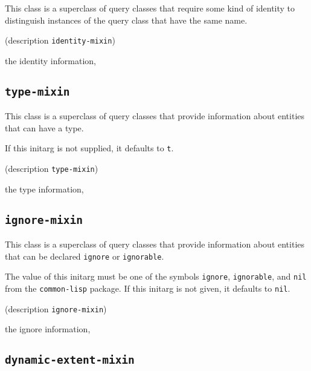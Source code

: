 This class is a superclass of query classes that require some kind of
identity to distinguish instances of the query class that have the
same name.

{\footnotesize
{}
}

{\footnotesize
{} {(description {\tt identity-mixin})}
}

 the identity information, 

\subsection{\texttt{type-mixin}}
\label{sec-type-mixin}

{\footnotesize
{}
}

This class is a superclass of query classes that provide information
about entities that can have a type.

{\footnotesize
{}
}

If this initarg is not supplied, it defaults to \texttt{t}.

{\footnotesize
{} {(description {\tt type-mixin})}
}

 the type information, 

\subsection{\texttt{ignore-mixin}}
\label{sec-ignore-mixin}

{\footnotesize
{}
}

This class is a superclass of query classes that provide information
about entities that can be declared \texttt{ignore} or \texttt{ignorable}.

{\footnotesize
{}
}

The value of this initarg must be one of the symbols \texttt{ignore},
\texttt{ignorable}, and \texttt{nil} from the \texttt{common-lisp}
package.  If this initarg is not given, it defaults to \texttt{nil}.

{\footnotesize
{} {(description {\tt ignore-mixin})}
}

 the ignore information, 

\subsection{\texttt{dynamic-extent-mixin}}
\label{sec-dynamic-extent-mixin}

